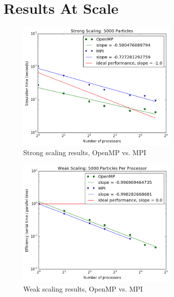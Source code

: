 \documentclass{article}
\begin{document}
\section{Results At Scale}\label{section:scale}
\begin{figure}[ht!]
\centering
\includegraphics[width=0.7\textwidth]{strong.png}
\caption{Strong scaling results, OpenMP vs. MPI}\label{fig:strong}
\end{figure}
\begin{figure}[ht!]
\centering
\includegraphics[width=0.7\textwidth]{weak.png}
\caption{Weak scaling results, OpenMP vs. MPI}\label{fig:weak}
\end{figure}
\end{document}
